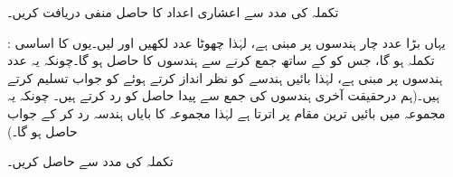   تکملہ    کی مدد سے اعشاری اعداد  کا حاصل منفی     دریافت  کریں۔ 
 
:\quad 
یہاں بڑا عدد    چار ہندسوں پر مبنی ہے،  لہٰذا چھوٹا  عدد   لکھیں اور    لیں۔یوں  کا اساسی  تکملہ   ہو گا، جس کو  کے ساتھ جمع کرنے سے   ہندسوں کا     حاصل ہو گا۔چونکہ یہ عدد  ہندسوں پر مبنی ہے،  لہٰذا  بائیں ہندسے   کو نظر انداز کرتے ہوئے  کو جواب تسلیم کرتے ہیں۔(ہم درحقیقت آخری ہندسوں کی جمع سے پیدا حاصل  کو رد کرتے ہیں۔ چونکہ یہ مجموعہ میں بائیں ترین مقام پر اترتا ہے لہٰذا مجموعہ کا بایاں ہندسہ رد کر کے جواب حاصل ہو گا۔)
\begin{center}
\begin{otherlanguage}{english}
\quad\quad
{}
\end{otherlanguage}
\end{center}
تکملہ   کی مدد سے    حاصل کریں۔ 

